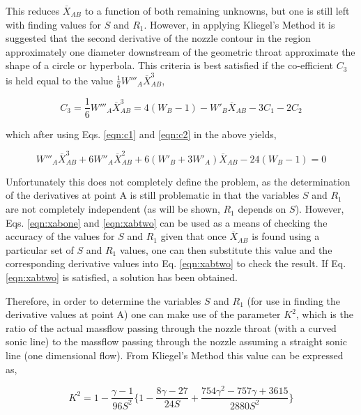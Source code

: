 	This reduces $\overline{X}_{AB}$ to a function of both remaining unknowns, but one
is still left with finding values for $S$ and $R_1$.  However, in applying Kliegel's Method 
it is suggested that the second derivative of the nozzle contour in the region approximately
one diameter downstream of the geometric throat approximate the shape of a circle or hyperbola.
This criteria is best satisfied if the co-efficient $C_3$ is held equal to
the value $\frac{1}{6}W'''_A \overline{X}_{AB}^3$,

\begin{displaymath}
	C_3 = \frac{1}{6}W'''_A \overline{X}_{AB}^3 = 	4(W_B -1) - W'_B\overline{X}_{AB} - 3C_1 - 2C_2
\end{displaymath}

	which after using Eqs. \ref{eqn:c1} and \ref{eqn:c2} in the above yields,

\begin{equation}
	W'''_A \overline{X}_{AB}^3 + 6W''_A\overline{X}_{AB}^2 + 6(W'_B + 3W'_A)\overline{X}_{AB}
	-24(W_B -1) = 0 
\label{eqn:xabtwo}
\end{equation}

	Unfortunately this does not completely define the problem, as the determination of 
the derivatives at point A is still problematic in that the variables $S$ and $R_1$ are not
completely independent (as will be shown, $R_1$ depends on $S$).  However, Eqs. \ref{eqn:xabone} 
and \ref{eqn:xabtwo} can be used as a means of checking the accuracy of the values for $S$ 
and $R_1$ given that once $\overline{X}_{AB}$ is found using a particular set of $S$ and $R_1$ values,
one can then substitute this value and the corresponding derivative values into Eq. \ref{eqn:xabtwo} to 
check the result.  If Eq. \ref{eqn:xabtwo} is satisfied, a solution has been obtained.  

	Therefore, in order to determine the variables $S$ and $R_1$ (for use in finding the
derivative values at point A) one can make use of the parameter $K^2$, which is the ratio of the 
actual massflow passing through the nozzle throat (with a curved sonic line) to the massflow
passing through the nozzle assuming a straight sonic line (one dimensional flow).  From Kliegel's
Method this value can be expressed as,

\begin{equation}
	K^2 = 1 - \frac{\gamma-1}{96S^2}\Big\{1 - \frac{8\gamma -27}{24S} + 
	\frac{754\gamma^2 -757\gamma+3615}{2880S^2}\Big\}
\label{eqn:massflow}
\end{equation}

